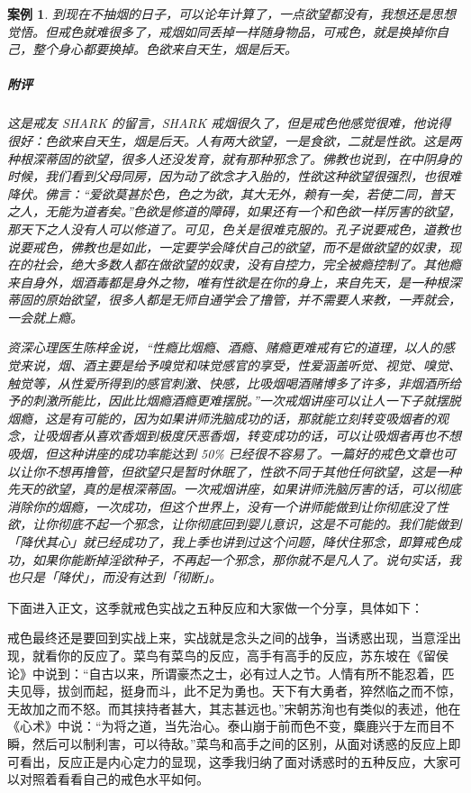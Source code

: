 \documentclass{ctexart}
\newtheorem{case}{案例}
\begin{document}
\begin{case}
    到现在不抽烟的日子，可以论年计算了，一点欲望都没有，我想还是思想觉悟。但戒色就难很多了，戒烟如同丢掉一样随身物品，可戒色，就是换掉你自己，整个身心都要换掉。色欲来自天生，烟是后天。
    \subparagraph{附评} 这是戒友 SHARK 的留言，SHARK 戒烟很久了，但是戒色他感觉很难，他说得很好：色欲来自天生，烟是后天。人有两大欲望，一是食欲，二就是性欲。这是两种根深蒂固的欲望，很多人还没发育，就有那种邪念了。佛教也说到，在中阴身的时候，我们看到父母同房，因为动了欲念才入胎的，性欲这种欲望很强烈，也很难降伏。佛言：“爱欲莫甚於色，色之为欲，其大无外，赖有一矣，若使二同，普天之人，无能为道者矣。”色欲是修道的障碍，如果还有一个和色欲一样厉害的欲望，那天下之人没有人可以修道了。可见，色关是很难克服的。孔子说要戒色，道教也说要戒色，佛教也是如此，一定要学会降伏自己的欲望，而不是做欲望的奴隶，现在的社会，绝大多数人都在做欲望的奴隶，没有自控力，完全被瘾控制了。其他瘾来自身外，烟酒毒都是身外之物，唯有性欲是在你的身上，来自先天，是一种根深蒂固的原始欲望，很多人都是无师自通学会了撸管，并不需要人来教，一弄就会，一会就上瘾。

    资深心理医生陈梓金说，“性瘾比烟瘾、酒瘾、赌瘾更难戒有它的道理，以人的感觉来说，烟、酒主要是给予嗅觉和味觉感官的享受，性爱涵盖听觉、视觉、嗅觉、触觉等，从性爱所得到的感官刺激、快感，比吸烟喝酒赌博多了许多，非烟酒所给予的刺激所能比，因此比烟瘾酒瘾更难摆脱。”一次戒烟讲座可以让人一下子就摆脱烟瘾，这是有可能的，因为如果讲师洗脑成功的话，那就能立刻转变吸烟者的观念，让吸烟者从喜欢香烟到极度厌恶香烟，转变成功的话，可以让吸烟者再也不想吸烟，但这种讲座的成功率能达到 50\% 已经很不容易了。一篇好的戒色文章也可以让你不想再撸管，但欲望只是暂时休眠了，性欲不同于其他任何欲望，这是一种先天的欲望，真的是根深蒂固。一次戒烟讲座，如果讲师洗脑厉害的话，可以彻底消除你的烟瘾，一次成功，但这个世界上，没有一个讲师能做到让你彻底没了性欲，让你彻底不起一个邪念，让你彻底回到婴儿意识，这是不可能的。我们能做到「降伏其心」就已经成功了，我上季也讲到过这个问题，降伏住邪念，即算戒色成功，如果你能断掉淫欲种子，不再起一个邪念，那你就不是凡人了。说句实话，我也只是「降伏」，而没有达到「彻断」。
\end{case}

下面进入正文，这季就戒色实战之五种反应和大家做一个分享，具体如下：

戒色最终还是要回到实战上来，实战就是念头之间的战争，当诱惑出现，当意淫出现，就看你的反应了。菜鸟有菜鸟的反应，高手有高手的反应，苏东坡在《留侯论》中说到：“自古以来，所谓豪杰之士，必有过人之节。人情有所不能忍着，匹夫见辱，拔剑而起，挺身而斗，此不足为勇也。天下有大勇者，猝然临之而不惊，无故加之而不怒。而其挟持者甚大，其志甚远也。”宋朝苏洵也有类似的表述，他在《心术》中说：“为将之道，当先治心。泰山崩于前而色不变，麋鹿兴于左而目不瞬，然后可以制利害，可以待敌。”菜鸟和高手之间的区别，从面对诱惑的反应上即可看出，反应正是内心定力的显现，这季我归纳了面对诱惑时的五种反应，大家可以对照着看看自己的戒色水平如何。
\end{document}
